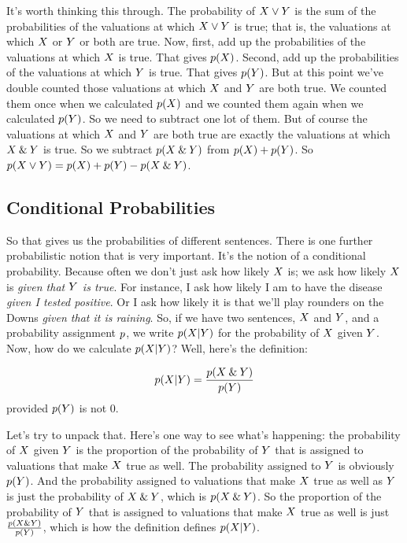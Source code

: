 It's worth thinking this through. The probability of $X \vee Y$ is the sum of the probabilities of the valuations at which $X \vee Y$ is true; that is, the valuations at which $X$ or $Y$ or both are true. Now, first, add up the probabilities of the valuations at which $X$ is true. That gives $p(X)$. Second, add up the probabilities of the valuations at which $Y$ is true. That gives $p(Y)$. But at this point we've double counted those valuations at which $X$ and $Y$ are both true. We counted them once when we calculated $p(X)$ and we counted them again when we calculated $p(Y)$. So we need to subtract one lot of them. But of course the valuations at which $X$ and $Y$ are both true are exactly the valuations at which $X\mathbin{\&} Y$ is true. So we subtract $p(X\mathbin{\&} Y)$ from $p(X) + p(Y)$. So $p(X \vee Y) = p(X) + p(Y) - p(X\mathbin{\&} Y)$.



\subsection{Conditional Probabilities}
So that gives us the probabilities of different sentences. There is one further probabilistic notion that is very important. It's the notion of a conditional probability. Because often we don't just ask how likely $X$ is; we ask how likely $X$ is \emph{given that $Y$ is true}. For instance, I ask how likely I am to have the disease \emph{given I tested positive}. Or I ask how likely it is that we'll play rounders on the Downs \emph{given that it is raining}. So, if we have two sentences, $X$ and $Y$, and a probability assignment $p$, we write $p(X | Y)$ for the probability of $X$ given $Y$. Now, how do we calculate $p(X |Y)$? Well, here's the definition:
\begin{highlighted}
\[
p(X | Y) = \frac{p(X\mathbin{\&} Y)}{p(Y)}
\]provided $p(Y)$ is not 0.
\end{highlighted}
 Let's try to unpack that. Here's one way to see what's happening: the probability of $X$ given $Y$ is the proportion of the probability of $Y$ that is assigned to valuations that make $X$ true as well. The probability assigned to $Y$ is obviously $p(Y)$. And the probability assigned to valuations that make $X$ true as well as $Y$ is just the probability of $X \mathbin{\&} Y$, which is $p(X \mathbin{\&} Y)$. So the proportion of the probability of $Y$ that is assigned to valuations that make $X$ true as well is just $\frac{p(X\mathbin{\&} Y)}{p(Y)}$, which is how the definition defines $p(X | Y)$.

